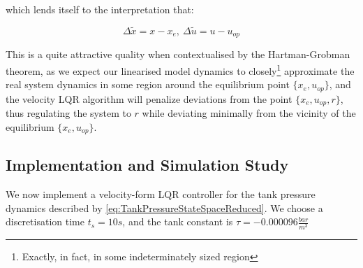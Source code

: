 which lends itself to the interpretation that:

\begin{equation}\label{eq:DeltaInterpretation}
	\Delta \tilde{x} = x-x_e, \ \Delta \tilde{u} = u-u_{op}
\end{equation}

\clearpage

This is a quite attractive quality when contextualised by the Hartman-Grobman theorem, as we expect our linearised model dynamics to closely\footnote{Exactly, in fact, in some indeterminately sized region} approximate the real system dynamics in some region around the equilibrium point $\{x_e,u_{op}\}$, and the velocity LQR algorithm will penalize deviations from the point $\{x_e,u_{op},r\}$, thus regulating the system to $r$ while deviating minimally from the vicinity of the equilibrium $\{x_e,u_{op}\}$.

\subsection{Implementation and Simulation Study}\label{subsec:LQRSimulationStudy}

We now implement a velocity-form LQR controller for the tank pressure dynamics described by \cref{eq:TankPressureStateSpaceReduced}. We choose a discretisation time $t_s = 10 \si{s}$, and the tank constant is $\tau = -0.000096 \frac{\si{bar}}{\si{m^3}}$

